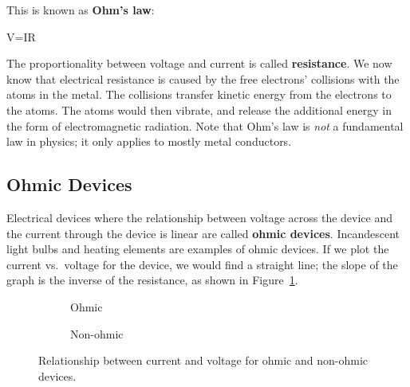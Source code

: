 This is known as \textbf{Ohm's law}:
\begin{important-equation}
  V=IR
\end{important-equation}
The proportionality between voltage and current is called \textbf{resistance}.
We now know that electrical resistance is caused by the free electrons'
collisions with the atoms in the metal. The collisions transfer kinetic energy
from the electrons to the atoms. The atoms would then vibrate, and release
the additional energy in the form of electromagnetic radiation.
Note that Ohm's law is \emph{not} a fundamental law in physics; it only applies
to mostly metal conductors.



\subsection{Ohmic Devices}

Electrical devices where the relationship between voltage across the device and
the current through the device is linear are called \textbf{ohmic devices}.
Incandescent light bulbs and heating elements are examples of ohmic devices.
If we plot the current vs.\ voltage for the device, we would find a straight
line; the slope of the graph is the inverse of the resistance, as shown in
Figure~\ref{fig:ohmic-relationship}.
\begin{figure}[ht]
  \centering
  \begin{subfigure}{.32\textwidth}
    \centering
    \caption{Ohmic}
    \label{fig:ohmic-relationship}
  \end{subfigure}
  \begin{subfigure}{.32\textwidth}
    \centering
    \caption{Non-ohmic}
    \label{fig:non-ohmic-relationship}
  \end{subfigure}
  \caption{Relationship between current and voltage for ohmic and non-ohmic
    devices.}
  \label{fig:i-vs-v-diagrams}
\end{figure}

